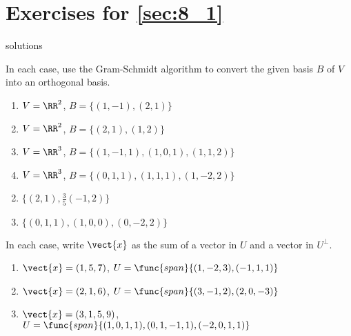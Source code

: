 
\section*{Exercises for \ref{sec:8_1}}

\begin{Filesave}{solutions}
\end{Filesave}

\begin{multicols}{2}
\begin{ex}
In each case, use the Gram-Schmidt algorithm to convert the given basis $B$ of $V$ into an orthogonal basis.


\begin{enumerate}[label={\alph*.}]
\item $V = \RR^2$, $B = \{(1, -1), (2, 1)\}$

\item $V = \RR^2$, $B = \{(2, 1), (1, 2)\}$

\item $V = \RR^3$, $B = \{(1, -1, 1), (1, 0, 1), (1, 1, 2)\}$

\item $V = \RR^3$, $B = \{(0, 1, 1), (1, 1, 1), (1, -2, 2)\}$

\end{enumerate}
\begin{sol}
\begin{enumerate}[label={\alph*.}]
\setcounter{enumi}{1}
\item  $\{(2,1),\frac{3}{5}(-1,2)\}$

\setcounter{enumi}{3}
\item  $\{(0,1,1),(1,0,0),(0,-2,2)\}$

\end{enumerate}
\end{sol}
\end{ex}

\begin{ex}
In each case, write $\vect{x}$ as the sum of a vector in $U$ and a vector in $U^\perp$.


\begin{enumerate}[label={\alph*.}, leftmargin=1em]
\item $\vect{x} = (1, 5, 7)$, $U = \func{span}\{(1, -2, 3), (-1, 1, 1)\}$

\item $\vect{x} = (2, 1, 6)$, $U = \func{span}\{(3, -1, 2), (2, 0, -3)\}$

\item $\vect{x} = (3, 1, 5, 9)$, \\ $U = \func{span}\{(1, 0, 1, 1), (0, 1, -1, 1), (-2, 0, 1, 1)\}$


\end{enumerate}
\end{ex}
\end{multicols}
